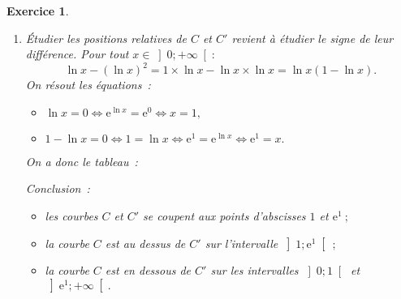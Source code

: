 \documentclass[10pt]{article}
\newtheorem{exo}{Exercice}
\begin{document}
\begin{exo}
\begin{enumerate}
\begin{itemize}
\item[\textbullet] $\lim\limits_{x\to +\infty}\ln x=+\infty,$ donc $\lim\limits_{x\to +\infty}\left(\ln x\right)^2=\text{\og}~\left(+\infty\right)^2~\text{ \fg}=+\infty.$
\item[\textbullet] $\lim\limits_{x\to 0,~x>0}\ln x=-\infty,$ donc $\lim\limits_{x\to 0,~x>0}\left(\ln x\right)^2=\text{\og}~\left(-\infty\right)^2~\text{ \fg}=+\infty.$
\end{itemize}


\item Étudier les positions relatives de $C$ et $C'$ revient à étudier le signe de leur différence. Pour tout $x\in\left]0;+\infty\right[:~$
\[\ln x-(\ln x)^2=1\times\ln x-\ln x\times\ln x=\ln x(1-\ln x).\] On résout les équations~:

\begin{itemize}
\item[\textbullet] $\ln x=0\iff \text{e}^{\ln x}=\text{e}^0\iff x=1,$
\item[\textbullet] $1-\ln x=0\iff 1=\ln x\iff \text{e}^1=\text{e}^{\ln x}\iff \text{e}^{1}=x.$
\end{itemize}

\medskip

On a donc le tableau~:

\medskip
\begin{center}
\end{center}

\medskip

Conclusion~:

\begin{itemize}
\item[\textbullet] les courbes $C$ et $C'$ se coupent aux points d'abscisses $1$ et $\text{e}^1~;$
\item[\textbullet] la courbe $C$ est au dessus de $C'$ sur l'intervalle $\left]1;\text{e}^1\right[~;$
\item[\textbullet] la courbe $C$ est en dessous de $C'$ sur les intervalles $\left]0;
1\right[$ et $\left]\text{e}^1;+\infty\right[.$
\end{itemize}




\end{enumerate}
\end{exo}
\end{document}
